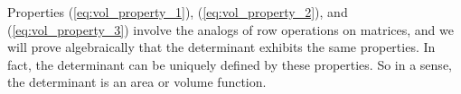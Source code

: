 Properties (\ref{eq:vol_property_1}), (\ref{eq:vol_property_2}), and (\ref{eq:vol_property_3}) involve the analogs of row operations on matrices, and we will prove algebraically that the determinant exhibits the same properties. In fact, the determinant can be uniquely defined by these properties. So in a sense, the determinant is an area or volume function. 



